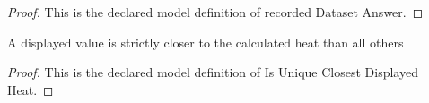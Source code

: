 \begin{proof}
  This is the declared model definition of recorded Dataset Answer.
\end{proof}
\begin{definition}
  \label{def:physics:phyx-mini-0452:phyxminiproblems-problemphyxmini0452-isuniqueclosestdisplayedheat}
  A displayed value is strictly closer to the calculated heat than all others
\end{definition}
\begin{proof}
  This is the declared model definition of Is Unique Closest Displayed Heat.
\end{proof}

